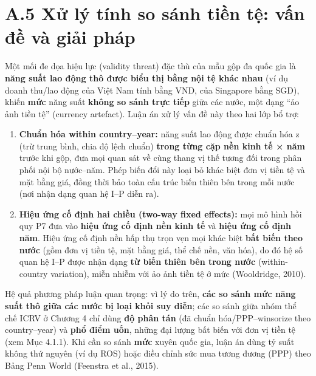 \documentclass[
  a4paper,
  13pt]{extreport}
\providecommand{\tightlist}{%
  \setlength{\itemsep}{0pt}\setlength{\parskip}{0pt}}
\begin{document}
\hypertarget{a.5-xux1eed-luxfd-tuxednh-so-suxe1nh-tiux1ec1n-tux1ec7-vux1ea5n-ux111ux1ec1-vuxe0-giux1ea3i-phuxe1p}{%
\section{A.5 Xử lý tính so sánh tiền tệ: vấn đề và giải
pháp}\label{a.5-xux1eed-luxfd-tuxednh-so-suxe1nh-tiux1ec1n-tux1ec7-vux1ea5n-ux111ux1ec1-vuxe0-giux1ea3i-phuxe1p}}

Một mối đe dọa hiệu lực (validity threat) đặc thù của mẫu gộp đa quốc
gia là \textbf{năng suất lao động thô được biểu thị bằng nội tệ khác
nhau} (ví dụ doanh thu/lao động của Việt Nam tính bằng VND, của
Singapore bằng SGD), khiến \textbf{mức} năng suất \textbf{không so sánh
trực tiếp} giữa các nước, một dạng ``ảo ảnh tiền tệ'' (currency
artefact). Luận án xử lý vấn đề này theo hai lớp bổ trợ:

\begin{enumerate}
\def\labelenumi{\arabic{enumi}.}
\tightlist
\item
  \textbf{Chuẩn hóa within country--year:} năng suất lao động được chuẩn
  hóa z (trừ trung bình, chia độ lệch chuẩn) \textbf{trong từng cặp nền
  kinh tế × năm} trước khi gộp, đưa mọi quan sát về cùng thang vị thế
  tương đối trong phân phối nội bộ nước--năm. Phép biến đổi này loại bỏ
  khác biệt đơn vị tiền tệ và mặt bằng giá, đồng thời bảo toàn cấu trúc
  biến thiên bên trong mỗi nước (nơi nhận dạng quan hệ I--P diễn ra).
\item
  \textbf{Hiệu ứng cố định hai chiều (two-way fixed effects):} mọi mô
  hình hồi quy P7 đưa vào \textbf{hiệu ứng cố định nền kinh tế} và
  \textbf{hiệu ứng cố định năm}. Hiệu ứng cố định nền hấp thụ trọn vẹn
  mọi khác biệt \textbf{bất biến theo nước} (gồm đơn vị tiền tệ, mặt
  bằng giá, thể chế nền, văn hóa), do đó hệ số quan hệ I--P được nhận
  dạng \textbf{từ biến thiên bên trong nước} (within-country variation),
  miễn nhiễm với ảo ảnh tiền tệ ở mức (Wooldridge, 2010).
\end{enumerate}

Hệ quả phương pháp luận quan trọng: vì lý do trên, \textbf{các so sánh
mức năng suất thô giữa các nước bị loại khỏi suy diễn}; các so sánh giữa
nhóm thể chế ICRV ở Chương 4 chỉ dùng \textbf{độ phân tán} (đã chuẩn
hóa/PPP--winsorize theo country--year) và \textbf{phổ điểm uốn}, những
đại lượng bất biến với đơn vị tiền tệ (xem Mục 4.1.1). Khi cần so sánh
\textbf{mức} xuyên quốc gia, luận án dùng tỷ suất không thứ nguyên (ví
dụ ROS) hoặc điều chỉnh sức mua tương đương (PPP) theo Bảng Penn World
(Feenstra et al., 2015).
\end{document}
